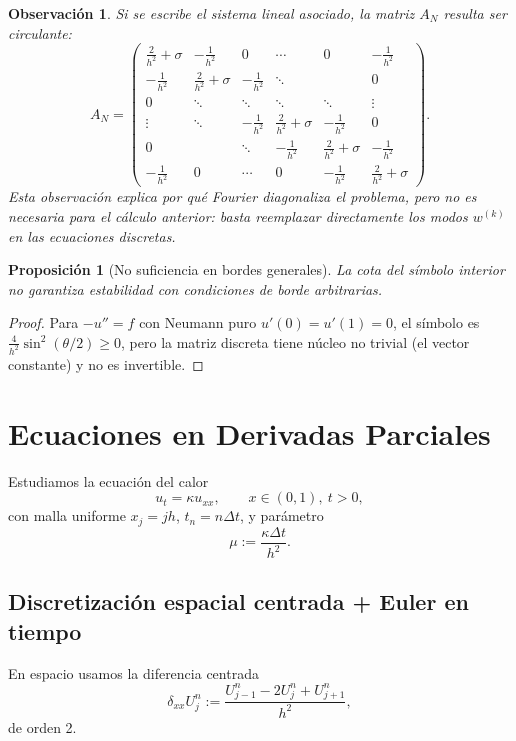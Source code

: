 \documentclass[a4paper,11pt]{report}
\newtheorem{proposition}[theorem]{Proposición}
\newtheorem{remark}[theorem]{Observación}
\begin{document}
\begin{remark}
Si se escribe el sistema lineal asociado, la matriz $A_N$ resulta ser circulante:
\[
  A_N=
  \begin{pmatrix}
    \frac{2}{h^2}+\sigma & -\frac{1}{h^2} & 0 & \cdots & 0 & -\frac{1}{h^2}\\
    -\frac{1}{h^2} & \frac{2}{h^2}+\sigma & -\frac{1}{h^2} & \ddots & & 0\\
    0 & \ddots & \ddots & \ddots & \ddots & \vdots\\
    \vdots & \ddots & -\frac{1}{h^2} & \frac{2}{h^2}+\sigma & -\frac{1}{h^2} & 0\\
    0 & & \ddots & -\frac{1}{h^2} & \frac{2}{h^2}+\sigma & -\frac{1}{h^2}\\
    -\frac{1}{h^2} & 0 & \cdots & 0 & -\frac{1}{h^2} & \frac{2}{h^2}+\sigma
  \end{pmatrix}.
\]
Esta observación explica por qué Fourier diagonaliza el problema, pero no es necesaria para el cálculo anterior: basta reemplazar directamente los modos $w^{(k)}$ en las ecuaciones discretas.
\end{remark}

\begin{proposition}[No suficiencia en bordes generales]
La cota del símbolo interior no garantiza estabilidad con condiciones de borde arbitrarias.
\end{proposition}

\begin{proof}
Para $-u''=f$ con Neumann puro $u'(0)=u'(1)=0$, el símbolo es $\frac{4}{h^2}\sin^2(\theta/2)\ge0$, pero la matriz discreta tiene núcleo no trivial (el vector constante) y no es invertible.
\end{proof}

\section{Ecuaciones en Derivadas Parciales}

Estudiamos la ecuación del calor
\[
  u_t=\kappa u_{xx},\qquad x\in(0,1),\ t>0,
\]
con malla uniforme $x_j=jh$, $t_n=n\Delta t$, y parámetro
\[
  \mu:=\frac{\kappa\Delta t}{h^2}.
\]

\subsection{Discretización espacial centrada + Euler en tiempo}

En espacio usamos la diferencia centrada
\[
  \delta_{xx}U_j^n:=\frac{U_{j-1}^n-2U_j^n+U_{j+1}^n}{h^2},
\]
de orden 2.
\end{document}

